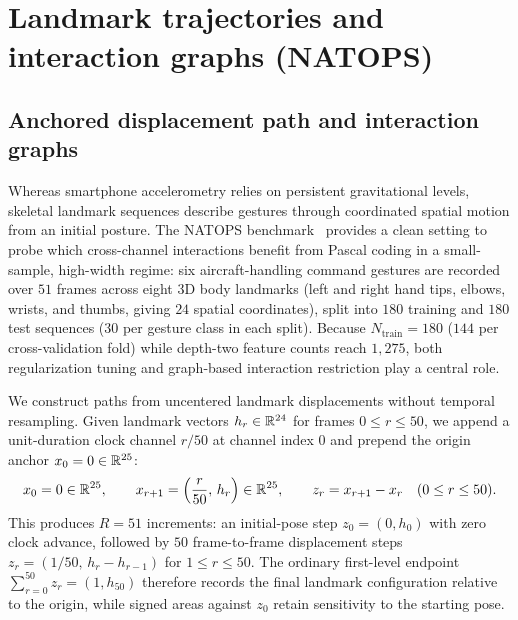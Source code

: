 \section{Landmark trajectories and interaction graphs (NATOPS)}
\label{app:natops}

\subsection{Anchored displacement path and interaction graphs}
Whereas smartphone accelerometry relies on persistent gravitational levels,
skeletal landmark sequences describe gestures through coordinated spatial motion
from an initial posture. The NATOPS benchmark~\cite{natopsoriginal,natops} provides a clean
setting to probe which cross-channel interactions benefit from Pascal coding in a
small-sample, high-width regime: six aircraft-handling command gestures are
recorded over \(51\) frames across eight 3D body landmarks (left and right hand
tips, elbows, wrists, and thumbs, giving \(24\) spatial coordinates), split into
\(180\) training and \(180\) test sequences (\(30\) per gesture class in each
split). Because \(N_{\mathrm{train}} = 180\) (\(144\) per cross-validation fold)
while depth-two feature counts reach \(1{,}275\), both regularization tuning and
graph-based interaction restriction play a central role.

We construct paths from uncentered landmark displacements without temporal
resampling. Given landmark vectors \(h_r \in \mathbb{R}^{24}\) for frames
\(0 \leq r \leq 50\), we append a unit-duration clock channel \(r/50\) at channel
index \(0\) and prepend the origin anchor \(x_0 = 0 \in \mathbb{R}^{25}\):
\[
 x_0 = 0 \in \mathbb{R}^{25}, \qquad
 x_{r+1} = \Bigl(\frac{r}{50},\, h_r\Bigr) \in \mathbb{R}^{25}, \qquad
 z_r = x_{r+1} - x_r \quad (0 \leq r \leq 50).
\]
This produces \(R = 51\) increments: an initial-pose step \(z_0 = (0, h_0)\) with
zero clock advance, followed by \(50\) frame-to-frame displacement steps
\(z_r = (1/50,\, h_r - h_{r-1})\) for \(1 \leq r \leq 50\). The ordinary
first-level endpoint \(\sum_{r=0}^{50} z_r = (1, h_{50})\) therefore records the
final landmark configuration relative to the origin, while signed areas against
\(z_0\) retain sensitivity to the starting pose.

